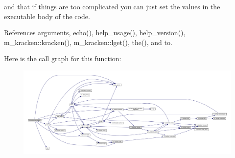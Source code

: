 and that if things are too complicated you can just set the values in the executable body of the code. 

References arguments, echo(), help\+\_\+usage(), help\+\_\+version(), m\+\_\+kracken\+::kracken(), m\+\_\+kracken\+::lget(), the(), and to.

Here is the call graph for this function\+:
\nopagebreak
\begin{figure}[H]
\begin{center}
\leavevmode
\includegraphics[width=350pt]{intrinsics_8f90_a47ddb3e494b21f6cf5e2853dc6d266b0_cgraph}
\end{center}
\end{figure}
